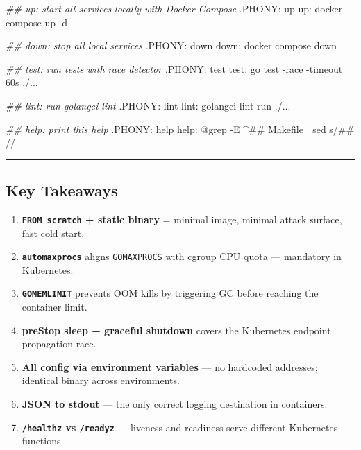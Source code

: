 \documentclass[
]{article}
\newenvironment{Shaded}{}{}
\newcommand{\CharTok}[1]{\textcolor[rgb]{0.25,0.44,0.63}{#1}}
\newcommand{\CommentTok}[1]{\textcolor[rgb]{0.38,0.63,0.69}{\textit{#1}}}
\newcommand{\DataTypeTok}[1]{\textcolor[rgb]{0.56,0.13,0.00}{#1}}
\newcommand{\DecValTok}[1]{\textcolor[rgb]{0.25,0.63,0.44}{#1}}
\newcommand{\FunctionTok}[1]{\textcolor[rgb]{0.02,0.16,0.49}{#1}}
\newcommand{\NormalTok}[1]{#1}
\newcommand{\OtherTok}[1]{\textcolor[rgb]{0.00,0.44,0.13}{#1}}
\newcommand{\StringTok}[1]{\textcolor[rgb]{0.25,0.44,0.63}{#1}}
\providecommand{\tightlist}{%
  \setlength{\itemsep}{0pt}\setlength{\parskip}{0pt}}
\begin{document}
\begin{Shaded}
\begin{Highlighting}[]
\CommentTok{\#\# up: start all services locally with Docker Compose}
\OtherTok{.PHONY:}\DataTypeTok{ up}
\DecValTok{up:}
\NormalTok{    docker compose up {-}d}

\CommentTok{\#\# down: stop all local services}
\OtherTok{.PHONY:}\DataTypeTok{ down}
\DecValTok{down:}
\NormalTok{    docker compose down}

\CommentTok{\#\# test: run tests with race detector}
\OtherTok{.PHONY:}\DataTypeTok{ test}
\DecValTok{test:}
\NormalTok{    go test {-}race {-}timeout 60s ./...}

\CommentTok{\#\# lint: run golangci{-}lint}
\OtherTok{.PHONY:}\DataTypeTok{ lint}
\DecValTok{lint:}
\NormalTok{    golangci{-}lint run ./...}

\CommentTok{\#\# help: print this help}
\OtherTok{.PHONY:}\DataTypeTok{ help}
\DecValTok{help:}
    \CharTok{@}\FunctionTok{grep {-}E }\StringTok{\textquotesingle{}\^{}\#\# \textquotesingle{}}\FunctionTok{ Makefile | sed }\StringTok{\textquotesingle{}s/\#\# //\textquotesingle{}}
\end{Highlighting}
\end{Shaded}

\begin{center}\rule{0.5\linewidth}{0.5pt}\end{center}

\hypertarget{key-takeaways-3}{%
\subsection{Key Takeaways}\label{key-takeaways-3}}

\begin{enumerate}
\def\labelenumi{\arabic{enumi}.}
\tightlist
\item
  \textbf{\texttt{FROM\ scratch} + static binary} = minimal image,
  minimal attack surface, fast cold start.
\item
  \textbf{\texttt{automaxprocs}} aligns \texttt{GOMAXPROCS} with cgroup
  CPU quota --- mandatory in Kubernetes.
\item
  \textbf{\texttt{GOMEMLIMIT}} prevents OOM kills by triggering GC
  before reaching the container limit.
\item
  \textbf{preStop sleep + graceful shutdown} covers the Kubernetes
  endpoint propagation race.
\item
  \textbf{All config via environment variables} --- no hardcoded
  addresses; identical binary across environments.
\item
  \textbf{JSON to stdout} --- the only correct logging destination in
  containers.
\item
  \textbf{\texttt{/healthz} vs \texttt{/readyz}} --- liveness and
  readiness serve different Kubernetes functions.
\end{enumerate}
\end{document}
